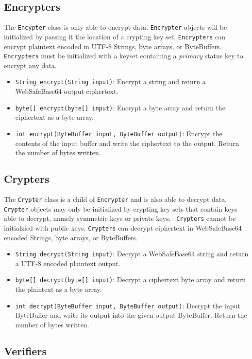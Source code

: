 \documentclass{llncs}
\begin{document}
\subsection{Encrypters}

The {\tt Encypter} class is only able to encrypt data. {\tt Encrypter} objects
will be initialized by passing it the location of a crypting key set.
{\tt Encrypters} can encrypt plaintext encoded in UTF-8 Strings, byte arrays, or
ByteBuffers. {\tt Encrypters} must be initialized with a keyset containing a
{\it primary} status key to encrypt any data.
\begin{itemize}
  \item {\tt String encrypt(String input)}: Encrypt a string and return a
  WebSafeBase64 output ciphertext.
  \item {\tt byte[] encrypt(byte[] input)}: Encrypt a byte array and return the
  ciphertext as a byte array.
  \item {\tt int encrypt(ByteBuffer input, ByteBuffer output)}: Encrypt the
  contents of the input buffer and write the ciphertext to the output. Return
  the number of bytes written.
\end{itemize}

\subsection{Crypters}

The {\tt Crypter} class is a child of {\tt Encrypter} and is also able to
decrypt data. {\tt Crypter} objects may only be initialized by crypting key sets
that contain keys able to decrypt, namely symmetric keys or private keys. {\tt
Crypters} cannot be initialzied with public keys. {\tt Crypters} can decrypt
ciphertext in WebSafeBase64 encoded Strings, byte arrays, or ByteBuffers.
\begin{itemize}
  \item {\tt String decrypt(String input)}: Decrypt a WebSafeBase64 string and
  return a UTF-8 encoded plaintext output.
  \item {\tt byte[] decrypt(byte[] input)}: Decrypt a ciphertext byte array and
  return the plaintext as a byte array.
  \item {\tt int decrypt(ByteBuffer input, ByteBuffer output)}: Decrypt the
  input ByteBuffer and write its output into the given output ByteBuffer.
  Return the number of bytes written.
\end{itemize}

\subsection{Verifiers}
\end{document}
